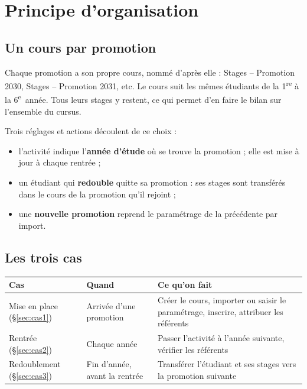 \documentclass[11pt,a4paper]{article}
\begin{document}
\newpage

\section{Principe d'organisation}

\subsection{Un cours par promotion}

Chaque promotion a son propre cours, nommé d'après elle :
\og Stages -- Promotion 2030\fg{}, \og Stages -- Promotion 2031\fg{}, etc.
Le cours suit les mêmes étudiants de la 1\textsuperscript{re} à la
6\textsuperscript{e}~année. Tous leurs stages y restent, ce qui permet d'en
faire le bilan sur l'ensemble du cursus.

Trois réglages et actions découlent de ce choix :
\begin{itemize}
  \item l'activité indique l'\textbf{année d'étude} où se trouve la promotion ;
        elle est mise à jour à chaque rentrée ;
  \item un étudiant qui \textbf{redouble} quitte sa promotion : ses stages sont
        transférés dans le cours de la promotion qu'il rejoint ;
  \item une \textbf{nouvelle promotion} reprend le paramétrage de la précédente
        par import.
\end{itemize}

\subsection{Les trois cas}

\begin{center}
\begin{tabularx}{\linewidth}{@{}l l X@{}}
\toprule
\textbf{Cas} & \textbf{Quand} & \textbf{Ce qu'on fait} \\
\midrule
Mise en place (§\ref{sec:cas1}) & Arrivée d'une promotion & Créer le cours, importer ou saisir le paramétrage, inscrire, attribuer les référents \\
Rentrée (§\ref{sec:cas2}) & Chaque année & Passer l'activité à l'année suivante, vérifier les référents \\
Redoublement (§\ref{sec:cas3}) & Fin d'année, avant la rentrée & Transférer l'étudiant et ses stages vers la promotion suivante \\
\bottomrule
\end{tabularx}
\end{center}
\end{document}
